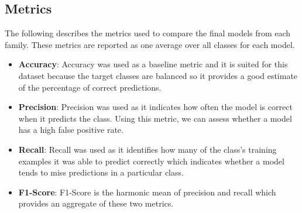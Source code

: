 \documentclass[12pt]{article}
\begin{document}
\subsection*{Metrics}
The following describes the metrics used to compare the final models from each family. These metrics are reported as one average over all classes for each model.
\begin{itemize}
    \item \textbf{Accuracy}: Accuracy was used as a baseline metric and it is suited for this dataset because the target classes are balanced so it provides a good estimate of the percentage of correct predictions.
    \item \textbf{Precision}: Precision was used as it indicates how often the model is correct when it predicts the class. Using this metric, we can assess whether a model has a high false positive rate.
    \item \textbf{Recall}: Recall was used as it identifies how many of the class's training examples it was able to predict correctly which indicates whether a model tends to miss predictions in a particular class.
    \item \textbf{F1-Score}: F1-Score is the harmonic mean of precision and recall which provides an aggregate of these two metrics.
\end{itemize}
\end{document}
